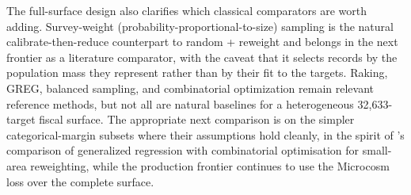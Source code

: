 The full-surface design also clarifies which classical comparators are worth adding. Survey-weight
(probability-proportional-to-size) sampling is the natural calibrate-then-reduce counterpart to random +
reweight and belongs in the next frontier as a literature comparator, with the caveat that it selects
records by the population mass they represent rather than by their fit to the targets. Raking, GREG,
balanced sampling, and combinatorial optimization remain relevant reference methods, but not all are
natural baselines for a heterogeneous
32{,}633-target fiscal surface. The appropriate next comparison is on the simpler categorical-margin
subsets where their assumptions hold cleanly, in the spirit of \citet{tanton2014co}'s comparison of
generalized regression with combinatorial optimisation for small-area reweighting, while the production
frontier continues to use the Microcosm loss over the complete surface.
